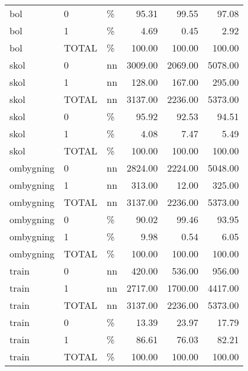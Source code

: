 \begin{longtable}[t]{lllrrr}
bol & 0 & \% & 95.31 & 99.55 & 97.08\\
bol & 1 & \% & 4.69 & 0.45 & 2.92\\
bol & TOTAL & \% & 100.00 & 100.00 & 100.00\\
skol & 0 & nn & 3009.00 & 2069.00 & 5078.00\\
skol & 1 & nn & 128.00 & 167.00 & 295.00\\
skol & TOTAL & nn & 3137.00 & 2236.00 & 5373.00\\
skol & 0 & \% & 95.92 & 92.53 & 94.51\\
skol & 1 & \% & 4.08 & 7.47 & 5.49\\
skol & TOTAL & \% & 100.00 & 100.00 & 100.00\\
ombygning & 0 & nn & 2824.00 & 2224.00 & 5048.00\\
ombygning & 1 & nn & 313.00 & 12.00 & 325.00\\
ombygning & TOTAL & nn & 3137.00 & 2236.00 & 5373.00\\
ombygning & 0 & \% & 90.02 & 99.46 & 93.95\\
ombygning & 1 & \% & 9.98 & 0.54 & 6.05\\
ombygning & TOTAL & \% & 100.00 & 100.00 & 100.00\\
train & 0 & nn & 420.00 & 536.00 & 956.00\\
train & 1 & nn & 2717.00 & 1700.00 & 4417.00\\
train & TOTAL & nn & 3137.00 & 2236.00 & 5373.00\\
train & 0 & \% & 13.39 & 23.97 & 17.79\\
train & 1 & \% & 86.61 & 76.03 & 82.21\\
train & TOTAL & \% & 100.00 & 100.00 & 100.00\\*
\end{longtable}
\endgroup{}
